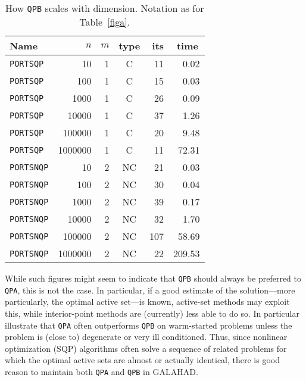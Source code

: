\documentclass[twoside]{article}
\newcommand{\gal}{{\sf GALAHAD}}
\begin{document}
\begin{table}[htb]
\begin{center}
\begin{tabular}[c]{|lrrc|rr|}
\hline
Name      & $n$ & $m$ & type & its & time\, \\
\hline
{\tt PORTSQP}  & 10 & 1  & C & 11    & {0.02} \\
{\tt PORTSQP}  & 100 & 1  & C &  15   & {0.03} \\
{\tt PORTSQP}  & 1000 & 1  & C &  26   & {0.09} \\
{\tt PORTSQP}  & 10000 & 1  & C &  37   & {1.26} \\
{\tt PORTSQP}  & 100000 & 1  & C &  20   & {9.48} \\
{\tt PORTSQP}  & 1000000 & 1  & C &  11   & {72.31} \\
\hline
{\tt PORTSNQP}  & 10 & 2  & NC & 21    & {0.03} \\
{\tt PORTSNQP}  & 100 & 2  & NC &  30   & {0.04} \\
{\tt PORTSNQP}  & 1000 & 2  & NC &  39   & {0.17} \\
{\tt PORTSNQP}  & 10000 & 2  & NC &  32   & {1.70} \\
{\tt PORTSNQP}  & 100000 & 2  & NC &  107   & { 58.69} \\
{\tt PORTSNQP}  & 1000000 & 2  & NC &  22   & {209.53} \\
\hline
\end{tabular}
\end{center}
\caption{\label{figb} How {\tt QPB} scales with dimension.
Notation as for Table~\ref{figa}.}
\end{table}

While such figures might seem to indicate that {\tt QPB} should always
be preferred to {\tt QPA}, this is not the case. In particular, if a
good estimate of the solution---more particularly, the optimal active 
set---is known, active-set methods may exploit this, 
while interior-point methods
are (currently) less able to do so. In particular
 illustrate that {\tt QPA} often outperforms {\tt QPB}
on warm-started problems unless the problem is (close to) degenerate or
very ill conditioned. Thus, since nonlinear optimization (SQP) algorithms 
often solve a sequence of related problems for which the optimal active sets
are almost or actually identical, there is good reason to maintain both
{\tt QPA} and {\tt QPB} in \gal.
\end{document}
